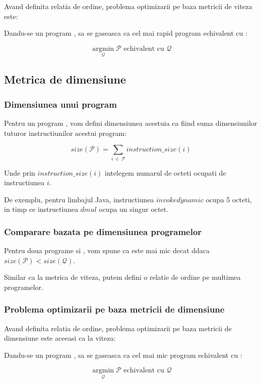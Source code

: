Avand definita relatia de ordine, problema optimizarii pe
baza metricii de viteza este:

Dandu-se un program , sa se gaseasca  ca cel mai rapid
program echivalent cu :

\[
	\operatorname*{argmin}_\mathcal{Q} \mathcal{P}
	\text{ echivalent cu  } \mathcal{Q}
\]

\subsection{Metrica de dimensiune}

\subsubsection{Dimensiunea unui program}

Pentru un program , vom defini dimensiunea acestuia ca fiind
suma dimensiunilor tuturor instructiunilor acestui program:

\[
	size(\mathcal{P}) = \sum_{i\ \in\ \mathcal{P}} instruction\_size(i)
\]

Unde prin \( instruction\_size(i) \) intelegem numarul de octeti
ocupati de instructiunea $i$.

De exemplu, pentru limbajul Java, instructiunea $invokedynamic$
ocupa 5 octeti, in timp ce instructiunea $dmul$ ocupa un singur
octet.

\subsubsection{Comparare bazata pe dimensiunea programelor}

Pentru doua programe  si , vom spune ca  este mai
mic decat  ddaca \(size(\mathcal{P}) < size(\mathcal{Q})\).

Similar ca la metrica de viteza, putem defini o relatie de ordine
pe multimea programelor.

\subsubsection{Problema optimizarii pe baza metricii de
	dimensiune}

Avand definita relatia de ordine, problema optimizarii pe
baza metricii de dimensiune este aceeasi ca la viteza:

Dandu-se un program , sa se gaseasca  ca cel mai mic
program echivalent cu :

\[
	\operatorname*{argmin}_\mathcal{Q} \mathcal{P}
	\text{ echivalent cu  } \mathcal{Q}
\]

